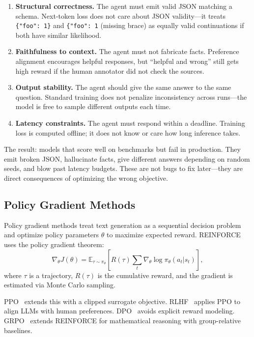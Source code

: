 \documentclass[11pt]{article}
\begin{document}
\begin{enumerate}[leftmargin=12pt]
    \item \textbf{Structural correctness.} The agent must emit valid JSON matching a schema. Next-token loss does not care about JSON validity---it treats \texttt{\{"foo": 1\}} and \texttt{\{"foo": 1} (missing brace) as equally valid continuations if both have similar likelihood.

    \item \textbf{Faithfulness to context.} The agent must not fabricate facts. Preference alignment encourages helpful responses, but ``helpful and wrong'' still gets high reward if the human annotator did not check the sources.

    \item \textbf{Output stability.} The agent should give the same answer to the same question. Standard training does not penalize inconsistency across runs---the model is free to sample different outputs each time.

    \item \textbf{Latency constraints.} The agent must respond within a deadline. Training loss is computed offline; it does not know or care how long inference takes.
\end{enumerate}

The result: models that score well on benchmarks but fail in production.
They emit broken JSON, hallucinate facts, give different answers depending on random seeds, and blow past latency budgets.
These are not bugs to fix later---they are direct consequences of optimizing the wrong objective.

\subsection{Policy Gradient Methods}

Policy gradient methods treat text generation as a sequential decision problem and optimize policy parameters $\theta$ to maximize expected reward.
REINFORCE~\citep{williams1992reinforce} uses the policy gradient theorem:
\begin{equation}
\nabla_\theta J(\theta) = \mathbb{E}_{\tau \sim \pi_\theta} \left[ R(\tau) \sum_{t} \nabla_\theta \log \pi_\theta(a_t | s_t) \right],
\end{equation}
where $\tau$ is a trajectory, $R(\tau)$ is the cumulative reward, and the gradient is estimated via Monte Carlo sampling.

PPO~\citep{schulman2017ppo} extends this with a clipped surrogate objective.
RLHF~\citep{ouyang2022rlhf} applies PPO to align LLMs with human preferences.
DPO~\citep{rafailov2023dpo} avoids explicit reward modeling.
GRPO~\citep{grpo} extends REINFORCE for mathematical reasoning with group-relative baselines.
\end{document}
